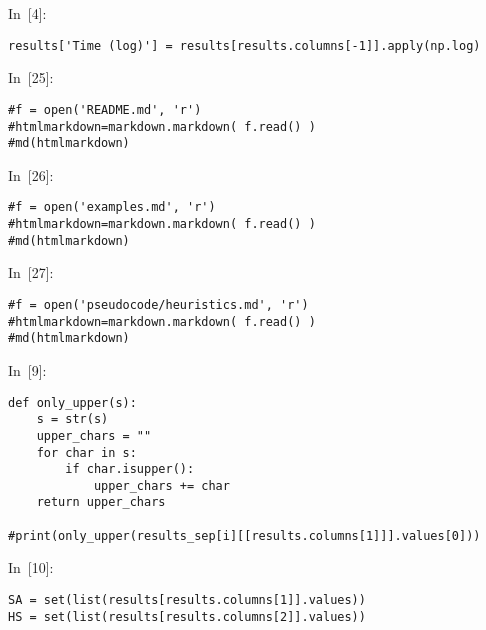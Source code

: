 \documentclass{article}
\begin{document}
In~[4]:

    
\begin{verbatim}results['Time (log)'] = results[results.columns[-1]].apply(np.log)
\end{verbatim}








In~[25]:

    
\begin{verbatim}#f = open('README.md', 'r')
#htmlmarkdown=markdown.markdown( f.read() )
#md(htmlmarkdown)
\end{verbatim}








In~[26]:

    
\begin{verbatim}#f = open('examples.md', 'r')
#htmlmarkdown=markdown.markdown( f.read() )
#md(htmlmarkdown)
\end{verbatim}








In~[27]:

    
\begin{verbatim}#f = open('pseudocode/heuristics.md', 'r')
#htmlmarkdown=markdown.markdown( f.read() )
#md(htmlmarkdown)
\end{verbatim}








In~[9]:

    
\begin{verbatim}def only_upper(s):
    s = str(s)
    upper_chars = ""
    for char in s:
        if char.isupper():
            upper_chars += char
    return upper_chars

#print(only_upper(results_sep[i][[results.columns[1]]].values[0]))
\end{verbatim}








In~[10]:

    
\begin{verbatim}SA = set(list(results[results.columns[1]].values))
HS = set(list(results[results.columns[2]].values))
\end{verbatim}
\end{document}
